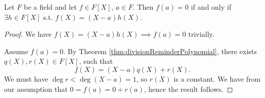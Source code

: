 \begin{corollary}
  Let $F$ be a field and let $f\in F[X]$, $a\in F$. Then $f(a)=0$ if and only if $\exists
  h\in F[X]$ s.t. $f(X)=(X-a)h(X)$.
  \label{cor:rootFactor}
\end{corollary}
\begin{proof}
We have $f(X) = (X-a)h(X)\implies f(a)=0$ trivially. 
    
Assume $f(a)=0.$ By Theorem \ref{thm:divisionReminderPolynomial}, there exists $q(X),r(X)\in F[X]$, such that $$f(X) = (X-a)q(X)+r(X).$$ We must have $\deg r < \deg (X-a) = 1$, so $r(X)$ is a constant. We have from our assumption that $0=f(a)=0+r(a)$, hence the result follows.
\end{proof}
